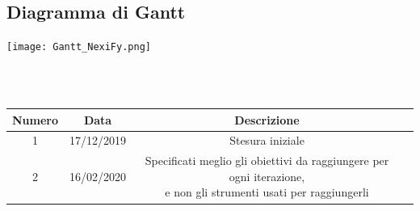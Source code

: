 \subsection{Diagramma di Gantt}
\vspace{0.5cm}
\begin{center}
	\hspace*{-2cm}\texttt{[image: Gantt\_NexiFy.png]}
\end{center}
\vspace{2cm}

 \\ \\
\begin{tabular}{|c | c | c | c|} 
 	\hline
	 Numero & Data & Descrizione \\ [0.5ex] 
	\hline\hline
	1 & 17/12/2019 & Stesura iniziale \\ 
	\hline
	2 & 16/02/2020 & \thead{Specificati meglio gli obiettivi da raggiungere per ogni iterazione,\\e non gli strumenti usati per raggiungerli} \\ 
	\hline
\end{tabular}